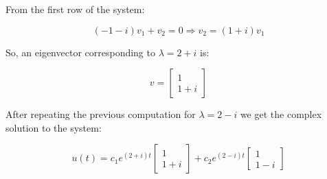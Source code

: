 From the first row of the system:

\[
    (-1 - i)v_1 + v_2 = 0 \Rightarrow v_2 = (1 + i)v_1
\]

So, an eigenvector corresponding to \( \lambda = 2 + i \) is:

\[
    v = \begin{bmatrix} 1 \\ 1 + i \end{bmatrix}
\]

After repeating the previous computation for \(\lambda = 2 - i\) we get the complex solution to the 
system:

\[
    u(t) = c_1 e^{(2 + i)t} \begin{bmatrix} 1 \\ 1 + i \end{bmatrix}
    + c_2 e^{(2 - i)t} \begin{bmatrix} 1 \\ 1 - i \end{bmatrix}
\]












